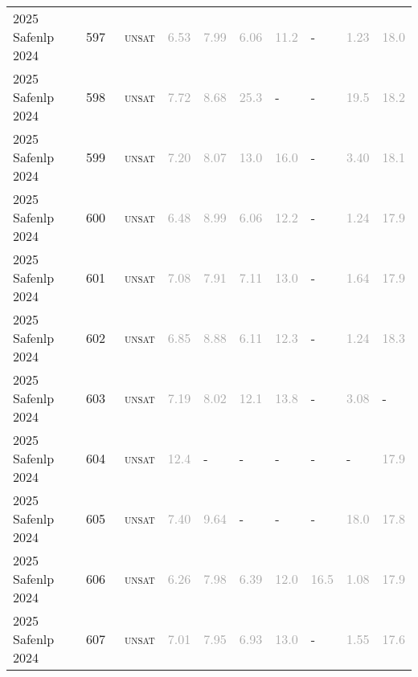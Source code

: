\begin{center}
{\begin{longtable}{@{}llllllllll@{}}
2025 Safenlp 2024 & 597 & ~\textsc{unsat} & \textcolor{darkgray}{6.53} & \textcolor{darkgray}{7.99} & \textcolor{darkgray}{6.06} & \textcolor{darkgray}{11.2} & - & \textcolor{darkgray}{1.23} & \textcolor{darkgray}{18.0} \\
2025 Safenlp 2024 & 598 & ~\textsc{unsat} & \textcolor{darkgray}{7.72} & \textcolor{darkgray}{8.68} & \textcolor{darkgray}{25.3} & - & - & \textcolor{darkgray}{19.5} & \textcolor{darkgray}{18.2} \\
2025 Safenlp 2024 & 599 & ~\textsc{unsat} & \textcolor{darkgray}{7.20} & \textcolor{darkgray}{8.07} & \textcolor{darkgray}{13.0} & \textcolor{darkgray}{16.0} & - & \textcolor{darkgray}{3.40} & \textcolor{darkgray}{18.1} \\
2025 Safenlp 2024 & 600 & ~\textsc{unsat} & \textcolor{darkgray}{6.48} & \textcolor{darkgray}{8.99} & \textcolor{darkgray}{6.06} & \textcolor{darkgray}{12.2} & - & \textcolor{darkgray}{1.24} & \textcolor{darkgray}{17.9} \\
2025 Safenlp 2024 & 601 & ~\textsc{unsat} & \textcolor{darkgray}{7.08} & \textcolor{darkgray}{7.91} & \textcolor{darkgray}{7.11} & \textcolor{darkgray}{13.0} & - & \textcolor{darkgray}{1.64} & \textcolor{darkgray}{17.9} \\
2025 Safenlp 2024 & 602 & ~\textsc{unsat} & \textcolor{darkgray}{6.85} & \textcolor{darkgray}{8.88} & \textcolor{darkgray}{6.11} & \textcolor{darkgray}{12.3} & - & \textcolor{darkgray}{1.24} & \textcolor{darkgray}{18.3} \\
2025 Safenlp 2024 & 603 & ~\textsc{unsat} & \textcolor{darkgray}{7.19} & \textcolor{darkgray}{8.02} & \textcolor{darkgray}{12.1} & \textcolor{darkgray}{13.8} & - & \textcolor{darkgray}{3.08} & - \\
2025 Safenlp 2024 & 604 & ~\textsc{unsat} & \textcolor{darkgray}{12.4} & - & - & - & - & - & \textcolor{darkgray}{17.9} \\
2025 Safenlp 2024 & 605 & ~\textsc{unsat} & \textcolor{darkgray}{7.40} & \textcolor{darkgray}{9.64} & - & - & - & \textcolor{darkgray}{18.0} & \textcolor{darkgray}{17.8} \\
2025 Safenlp 2024 & 606 & ~\textsc{unsat} & \textcolor{darkgray}{6.26} & \textcolor{darkgray}{7.98} & \textcolor{darkgray}{6.39} & \textcolor{darkgray}{12.0} & \textcolor{darkgray}{16.5} & \textcolor{darkgray}{1.08} & \textcolor{darkgray}{17.9} \\
2025 Safenlp 2024 & 607 & ~\textsc{unsat} & \textcolor{darkgray}{7.01} & \textcolor{darkgray}{7.95} & \textcolor{darkgray}{6.93} & \textcolor{darkgray}{13.0} & - & \textcolor{darkgray}{1.55} & \textcolor{darkgray}{17.6} \\

\end{longtable}}
\end{center}
